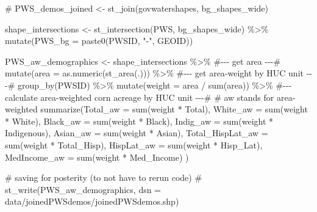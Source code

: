 \documentclass[
  letterpaper,
  DIV=11,
  numbers=noendperiod]{scrartcl}
\newenvironment{Shaded}{\begin{snugshade}}{\end{snugshade}}
\newcommand{\AttributeTok}[1]{\textcolor[rgb]{0.40,0.45,0.13}{#1}}
\newcommand{\CommentTok}[1]{\textcolor[rgb]{0.37,0.37,0.37}{#1}}
\newcommand{\FunctionTok}[1]{\textcolor[rgb]{0.28,0.35,0.67}{#1}}
\newcommand{\NormalTok}[1]{\textcolor[rgb]{0.00,0.23,0.31}{#1}}
\newcommand{\OtherTok}[1]{\textcolor[rgb]{0.00,0.23,0.31}{#1}}
\newcommand{\SpecialCharTok}[1]{\textcolor[rgb]{0.37,0.37,0.37}{#1}}
\newcommand{\StringTok}[1]{\textcolor[rgb]{0.13,0.47,0.30}{#1}}
\begin{document}
\begin{Shaded}
\begin{Highlighting}[]
\CommentTok{\# PWS\_demos\_joined \textless{}{-} st\_join(govwatershapes, bg\_shapes\_wide)}

\NormalTok{shape\_intersections }\OtherTok{\textless{}{-}} \FunctionTok{st\_intersection}\NormalTok{(PWS, bg\_shapes\_wide) }\SpecialCharTok{\%\textgreater{}\%} 
  \FunctionTok{mutate}\NormalTok{(}\AttributeTok{PWS\_bg =} \FunctionTok{paste0}\NormalTok{(PWSID, }\StringTok{"{-}"}\NormalTok{, GEOID))}

\NormalTok{PWS\_aw\_demographics }\OtherTok{\textless{}{-}}\NormalTok{ shape\_intersections }\SpecialCharTok{\%\textgreater{}\%} 
  \CommentTok{\#{-}{-}{-} get area {-}{-}{-}\#}
  \FunctionTok{mutate}\NormalTok{(}\AttributeTok{area =} \FunctionTok{as.numeric}\NormalTok{(}\FunctionTok{st\_area}\NormalTok{(.))) }\SpecialCharTok{\%\textgreater{}\%} 
  \CommentTok{\#{-}{-}{-} get area{-}weight by HUC unit {-}{-}{-}\#}
  \FunctionTok{group\_by}\NormalTok{(PWSID) }\SpecialCharTok{\%\textgreater{}\%} 
  \FunctionTok{mutate}\NormalTok{(}\AttributeTok{weight =}\NormalTok{ area }\SpecialCharTok{/} \FunctionTok{sum}\NormalTok{(area)) }\SpecialCharTok{\%\textgreater{}\%} 
  \CommentTok{\#{-}{-}{-} calculate area{-}weighted corn acreage by HUC unit {-}{-}{-}\#}
  \CommentTok{\# \textquotesingle{}aw\textquotesingle{} stands for area{-}weighted }
  \FunctionTok{summarize}\NormalTok{(}\AttributeTok{Total\_aw =} \FunctionTok{sum}\NormalTok{(weight }\SpecialCharTok{*}\NormalTok{ Total),}
            \AttributeTok{White\_aw =} \FunctionTok{sum}\NormalTok{(weight }\SpecialCharTok{*}\NormalTok{ White),}
            \AttributeTok{Black\_aw =} \FunctionTok{sum}\NormalTok{(weight }\SpecialCharTok{*}\NormalTok{ Black),}
            \AttributeTok{Indig\_aw =} \FunctionTok{sum}\NormalTok{(weight }\SpecialCharTok{*}\NormalTok{ Indigenous),}
            \AttributeTok{Asian\_aw =} \FunctionTok{sum}\NormalTok{(weight }\SpecialCharTok{*}\NormalTok{ Asian),}
            \AttributeTok{Total\_HispLat\_aw =} \FunctionTok{sum}\NormalTok{(weight }\SpecialCharTok{*}\NormalTok{ Total\_Hisp),}
            \AttributeTok{HispLat\_aw =} \FunctionTok{sum}\NormalTok{(weight }\SpecialCharTok{*}\NormalTok{ Hisp\_Lat),}
            \AttributeTok{MedIncome\_aw =} \FunctionTok{sum}\NormalTok{(weight }\SpecialCharTok{*}\NormalTok{ Med\_Income)}
\NormalTok{  )}

\CommentTok{\# saving for posterity (to not have to rerun code)}
\CommentTok{\# st\_write(PWS\_aw\_demographics, dsn = \textquotesingle{}data/joinedPWSdemos/joinedPWSdemos.shp\textquotesingle{})}


\end{Highlighting}
\end{Shaded}
\end{document}
